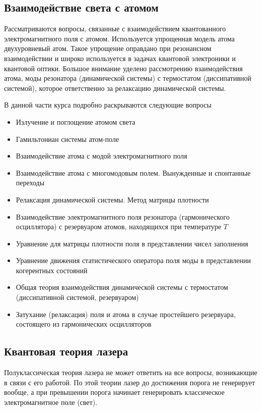 \subsection{Взаимодействие света с атомом}
Рассматриваются вопросы, связанные с взаимодействием квантованного
электромагнитного поля с атомом. Используется упрощенная модель атома 
двухуровневый атом. Такое упрощение оправдано при резонансном
взаимодействии и широко используется в задачах квантовой электроники и
квантовой оптики. Большое внимание уделено рассмотрению
взаимодействия атома, моды резонатора (динамической системы) с
термостатом (диссипативной системой), которое ответственно за
релаксацию динамической системы.  

В данной части курса подробно раскрываются следующие вопросы
\begin{itemize}
\item Излучение и поглощение атомом света
\item Гамильтониан системы атом-поле
\item Взаимодействие атома с модой электромагнитного поля
\item Взаимодействие атома с многомодовым полем. Вынужденные и
  спонтанные переходы
\item Релаксация динамической системы. Метод матрицы плотности
\item Взаимодействие электромагнитного поля резонатора
  (гармонического осциллятора) с резервуаром атомов, находящихся при
  температуре $T$
\item Уравнение для матрицы плотности поля в представлении чисел
  заполнения
\item Уравнение движения статистического оператора поля моды в
  представлении когерентных состояний
\item Общая теория взаимодействия динамической системы с
  термостатом (диссипативной системой, резервуаром)
\item Затухание (релаксация) поля и атома в случае простейшего
  резервуара, состоящего из гармонических осцилляторов
\end{itemize}

\subsection{Квантовая теория лазера}
Полуклассическая теория лазера не может ответить на все вопросы,
возникающие в связи с его работой. По этой теории лазер до достижения
порога  не генерирует вообще, а при превышении порога начинает
генерировать классическое электромагнитное поле (свет). 

